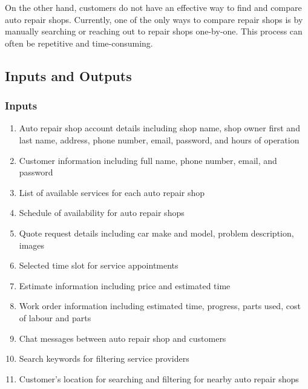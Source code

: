 \documentclass{article}
\begin{document}
On the other hand, customers do not have an effective way to find and compare auto repair shops. 
Currently, one of the only ways to compare repair shops is by manually searching or reaching out to repair shops one-by-one. 
This process can often be repetitive and time-consuming.

\subsection{Inputs and Outputs}
\subsubsection{Inputs}
\begin{enumerate}
    \item Auto repair shop account details including shop name, shop owner first and last name, address, phone number, email, password, and hours of operation
    \item Customer information including full name, phone number, email, and password
    \item List of available services for each auto repair shop
    \item Schedule of availability for auto repair shops
    \item Quote request details including car make and model, problem description, images
    \item Selected time slot for service appointments
    \item Estimate information including price and estimated time
    \item Work order information including estimated time, progress, parts used, cost of labour and parts
    \item Chat messages between auto repair shop and customers
    \item Search keywords for filtering service providers
    \item Customer's location for searching and filtering for nearby auto repair shops
\end{enumerate}
\end{document}
